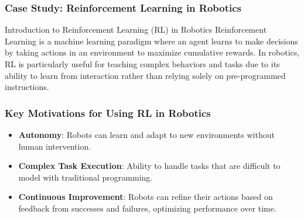 \documentclass[aspectratio=169]{beamer}
\begin{document}
\begin{frame}[fragile]
    \frametitle{Case Study: Reinforcement Learning in Robotics}
    \begin{block}{Introduction to Reinforcement Learning (RL) in Robotics}
      Reinforcement Learning is a machine learning paradigm where an agent learns to make decisions by taking actions in an environment to maximize cumulative rewards. In robotics, RL is particularly useful for teaching complex behaviors and tasks due to its ability to learn from interaction rather than relying solely on pre-programmed instructions.
    \end{block}
\end{frame}

\begin{frame}[fragile]
    \frametitle{Key Motivations for Using RL in Robotics}
    \begin{itemize}
        \item \textbf{Autonomy}: Robots can learn and adapt to new environments without human intervention.
        \item \textbf{Complex Task Execution}: Ability to handle tasks that are difficult to model with traditional programming.
        \item \textbf{Continuous Improvement}: Robots can refine their actions based on feedback from successes and failures, optimizing performance over time.
    \end{itemize}
\end{frame}
\end{document}
